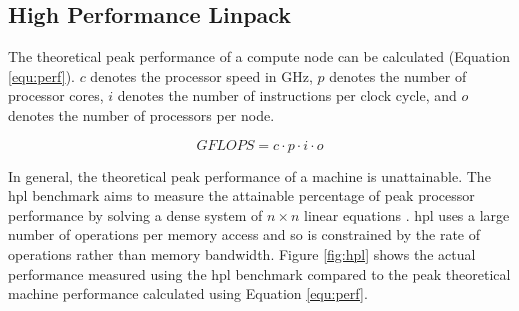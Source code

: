 \documentclass[a4paper,11pt]{report}
\begin{document}
\subsection{High Performance Linpack}
The theoretical peak performance of a compute node can be calculated (Equation \ref{equ:perf}). $c$ denotes the processor speed in GHz, $p$ denotes the number of processor cores, $i$ denotes the number of instructions per clock cycle, and $o$ denotes the number of processors per node. 

\begin{equation}
GFLOPS = c \cdot p \cdot i \cdot o 
\label{equ:perf}
\end{equation}
\par
In general, the theoretical peak performance of a machine is unattainable. The \gls{hpl} benchmark aims to measure the attainable percentage of peak processor performance by solving a dense system of $n\times n$ linear equations \cite{dongarra2008linpack}. \gls{hpl} uses a large number of operations per memory access and so is constrained by the rate of operations rather than memory bandwidth. Figure \ref{fig:hpl} shows the actual performance measured using the \gls{hpl} benchmark compared to the peak theoretical machine performance calculated using Equation \ref{equ:perf}. 
\end{document}
